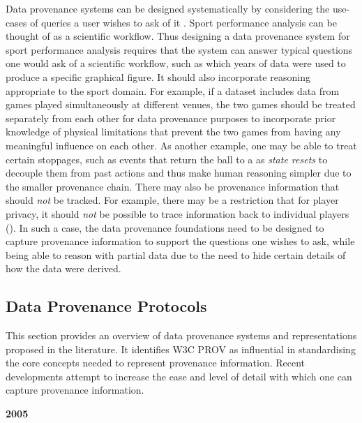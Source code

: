 Data provenance systems can be designed systematically by considering the use-cases of queries a user wishes to ask of it \cite{Bowers2006}. Sport performance analysis can be thought of as a scientific workflow. Thus designing a data provenance system for sport performance analysis requires that the system can answer typical questions one would ask of a scientific workflow, such as which years of data were used to produce a specific graphical figure. It should also incorporate reasoning appropriate to the sport domain. For example, if a dataset includes data from games played simultaneously at different venues, the two games should be treated separately from each other for data provenance purposes to incorporate prior knowledge of physical limitations that prevent the two games from having any meaningful influence on each other. As another example, one may be able to treat certain stoppages, such as events that return the ball to a \centrebounce{} as \textit{state resets} to decouple them from past actions and thus make human reasoning simpler due to the smaller provenance chain. There may also be provenance information that should \textit{not} be tracked. For example, there may be a restriction that for player privacy, it should \textit{not} be possible to trace information back to individual players (). In such a case, the data provenance foundations need to be designed to capture provenance information to support the questions one wishes to ask, while being able to reason with partial data due to the need to hide certain details of how the data were derived.

\subsection{Data Provenance Protocols}

This section provides an overview of data provenance systems and representations proposed in the literature. It identifies W3C PROV \cite{Moreau2015} as influential in standardising the core concepts needed to represent provenance information. Recent developments attempt to increase the ease and level of detail with which one can capture provenance information.

\textbf{2005}

